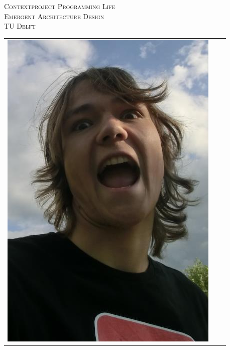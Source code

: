 \begin{titlepage}
\begin{center}
\textsc{\LARGE Contextproject Programming Life}\\
\vspace{5pt}
\textsc{\LARGE Emergent Architecture Design}\\
\vspace{5pt}
\textsc{\large TU Delft}

\begin{table}[ht]
\centering
\begin{tabular}{ccc}
\includegraphics[scale=0.2]{ruben.png}   &

\end{tabular}
\end{table}
\end{center}
\end{titlepage}

